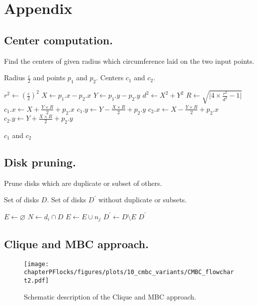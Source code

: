 \clearpage
\appendix

\renewcommand\appendixname{}
\renewcommand\appendixpagename{}
\renewcommand{\thechapter}{}
\renewcommand{\thesection}{\Alph{section}}

\chapter{Appendix}
\section{Center computation.}
{\ssp
\begin{algorithm}[h!]
    \caption{Find the centers of given radius which circumference laid on the two input points.}
    \begin{algorithmic}[1]
        \Require Radius $\frac{\varepsilon}{2}$ and points $p_1$ and $p_2$.
        \Ensure Centers $c_1$ and $c_2$.
        
        \State $r^2 \gets (\frac{\varepsilon}{2})^2$
        \State $X \gets p_1.x - p_2.x$
        \State $Y \gets p_1.y - p_2.y$
        \State $d^2 \gets X^2 + Y^2$
        \State $R \gets \sqrt{\lvert 4 \times \frac{r^2}{d^2} - 1 \rvert}$
        \State $c_1.x \gets X + \frac{Y \times R}{2} + p_2.x$
        \State $c_1.y \gets Y - \frac{X \times R}{2} + p_2.y$
        \State $c_2.x \gets X - \frac{Y \times R}{2} + p_2.x$
        \State $c_2.y \gets Y + \frac{X \times R}{2} + p_2.y$
        
        \State \Return $c_1$ and $c_2$
        \EndFunction
    \end{algorithmic}
    \label{app:centers}
\end{algorithm}
}

\clearpage
\section{Disk pruning.}
{\ssp
\begin{algorithm}[h!]
    \caption{Prune disks which are duplicate or subset of others.}
     \begin{algorithmic}[1]
         \Require Set of disks $D$.
         \Ensure Set of disks $D^{\prime}$ without duplicate or subsets.
         
         \State $E \gets \varnothing$
             \State $N \gets d_i \cap D$
                         \State $E \gets E \cup {n_j}$
                 \EndIf
             \EndFor
         \EndFor        
         \State $D^{\prime} \gets D \setminus E$
         \State \Return $D^{\prime}$
         \EndFunction
     \end{algorithmic}
    \label{app:disks}
\end{algorithm}
}

\clearpage
\section{Clique and MBC approach.}\label{app:cmbc_flowchar}
\begin{figure}[h!]
    \centering
    \texttt{[image: chapterPFlocks/figures/plots/10\_cmbc\_variants/CMBC\_flowchart2.pdf]}
    \caption[]{Schematic description of the Clique and MBC approach.}
\end{figure}


